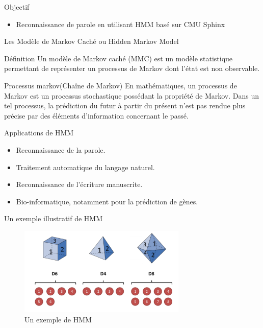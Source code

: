 \begin{frame}{Objectif}

\begin{itemize}
\item Reconnaissance de parole en utilisant HMM basé sur CMU Sphinx
\end{itemize}

\end{frame}

\begin{frame}{Les Modèle de Markov Caché ou Hidden Markov Model}

\begin{block}{Définition}
Un modèle de Markov caché (MMC) est un modèle
statistique permettant de représenter un processus
de Markov dont l’état est non observable. 
	\end{block}
	\begin{block}{Processus markov(Chaîne de Markov)}
	En mathématiques, un processus de Markov est un processus stochastique possédant la propriété de Markov. Dans un tel processus, la prédiction du futur à partir du présent n'est pas rendue plus précise par des éléments d'information concernant le passé.
	\end{block}
\end{frame}

\begin{frame}{Applications de HMM}
\begin{itemize}
\item Reconnaissance de la parole.
\item Traitement automatique du langage naturel.
\item Reconnaissance de l'écriture manuscrite.
\item Bio-informatique, notamment pour la prédiction de gènes.
\end{itemize}
\end{frame}

\begin{frame}{Un exemple illustratif de HMM}
\begin{figure}
\centering
\includegraphics[width=8cm]{images/hmm.png}
\caption{Un exemple de HMM}
\end{figure}
\end{frame}



